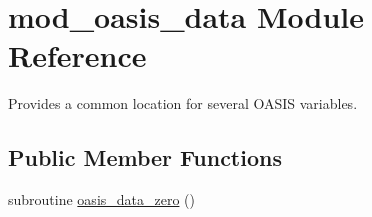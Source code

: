 \hypertarget{classmod__oasis__data}{\section{mod\+\_\+oasis\+\_\+data Module Reference}
\label{classmod__oasis__data}
}


Provides a common location for several O\+A\+S\+I\+S variables.  


\subsection*{Public Member Functions}
\begin{DoxyCompactItemize}
\item 
subroutine \hyperlink{classmod__oasis__data_a7a3b7c8004b8d8869bbfa1fd4723da3e}{oasis\+\_\+data\+\_\+zero} ()
\end{DoxyCompactItemize}
